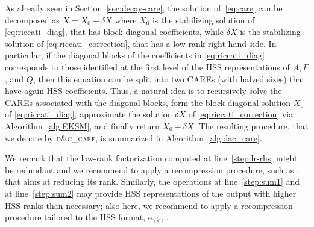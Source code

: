 \documentclass[a4paper,10pt]{article}
\begin{document}
As already seen in Section~\ref{sec:decay-care}, the solution of~\eqref{eq:care} can be decomposed as $X=X_0+\delta X$ where $X_0$ is the stabilizing solution of \eqref{eq:riccati_diag}, that has block diagonal coefficients, while $\delta X$ is the stabilizing solution of \eqref{eq:riccati_correction}, that has a low-rank right-hand side. In particular, if the diagonal blocks of the coefficients in \eqref{eq:riccati_diag} corresponds to those identified at the first level of the HSS representations of $A,F$, and $Q$, then this equation can be split into two CAREs (with halved sizes) that have again HSS coefficients. Thus, a natural idea is to  recursively solve the CAREs associated with the diagonal
blocks, form the block diagonal solution $X_0$ of \eqref{eq:riccati_diag}, approximate the solution $\delta X$ of \eqref{eq:riccati_correction} via Algorithm~\ref{alg:EKSM}, and finally return $X_0+\delta X$. The resulting procedure, that we denote by \textsc{d\&c\_care}, is summarized in Algorithm~\ref{alg:dac_care}. 

We remark that the low-rank factorization computed at line~\ref{step:lr-rhs} might be redundant and we recommend to apply a recompression procedure, such as \cite[Algorithm 2.17]{hackbusch15}, that aims at reducing its rank. Similarly, the operations at line~\ref{step:sum1} and at line~\ref{step:sum2} may provide HSS representations of the output with higher HSS ranks than necessary; also here, we recommend to apply a recompression procedure tailored to the HSS format, e.g., \cite[Algorithm 3]{xia2012complexity}. 
\end{document}
